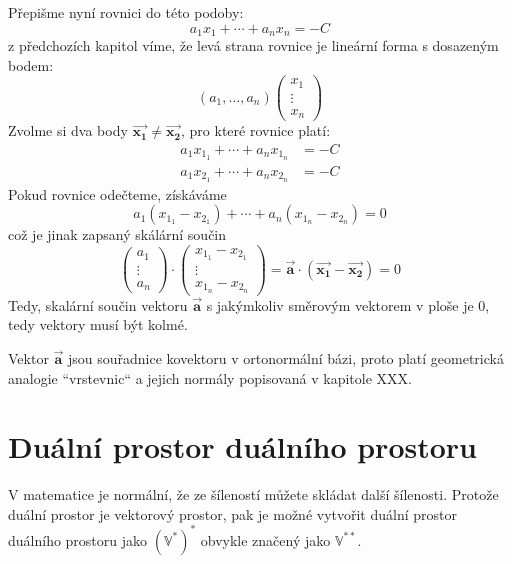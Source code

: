 \documentclass[a5paper,12pt]{amsbook}
\theoremstyle{definition}
\newcommand{\mycoord}[1]{\overrightarrow{\mathbf{#1}}}
\newcommand{\myspace}[1]{\mathbb{#1}}
\newcommand{\mydual}[1]{\myspace{#1^{*}}}
\newcommand{\mydouble}[1]{\myspace{#1^{**}}}
\begin{document}
Přepišme nyní rovnici do této podoby:
\begin{equation*}
a_1x_1 + \cdots + a_nx_n = -C
\end{equation*}
z předchozích kapitol víme, že levá strana rovnice je lineární forma s dosazeným bodem:
\begin{equation*}
\left(a_1, \ldots, a_n\right)\left(\begin{array}{c}x_1 \\ \vdots \\ x_n\end{array}\right)
\end{equation*}
Zvolme si dva body $\mycoord{x_1} \neq \mycoord{x_2}$, pro které rovnice platí:
\begin{equation*}
\begin{split}
a_1x_{1_1} + \cdots + a_nx_{1_n} &= -C \\
a_1x_{2_1} + \cdots + a_nx_{2_n} &= -C
\end{split}
\end{equation*}
Pokud rovnice odečteme, získáváme
\begin{equation*}
a_1(x_{1_1} - x_{2_1}) + \cdots + a_n(x_{1_n} - x_{2_n}) = 0
\end{equation*}
což je jinak zapsaný skálární součin
\begin{equation*}
\left(\begin{array}{c}a_1 \\ \vdots \\ a_n\end{array}\right)\cdot\left(\begin{array}{c}x_{1_1}-x_{2_1} \\
  \vdots \\ x_{1_n} - x_{2_n}\end{array}\right) = \mycoord{a} \cdot (\mycoord{x_1} - \mycoord{x_2}) = 0
\end{equation*}
Tedy, skalární součin vektoru $\mycoord{a}$ s jakýmkoliv směrovým vektorem v ploše je 0, tedy vektory
musí být kolmé.

Vektor $\mycoord{a}$ jsou souřadnice kovektoru v ortonormální bázi, proto platí geometrická analogie
``vrstevnic`` a jejich normály popisovaná v kapitole XXX.

\section{Duální prostor duálního prostoru}\label{section:dual-dual}

\noindent V matematice je normální, že ze šíleností můžete skládat další šílenosti. Protože duální
prostor je vektorový prostor, pak je možné vytvořit duální prostor duálního prostoru jako
$\mydual{(\mydual{V})}$ obvykle značený jako $\mydouble{V}$.
\end{document}
